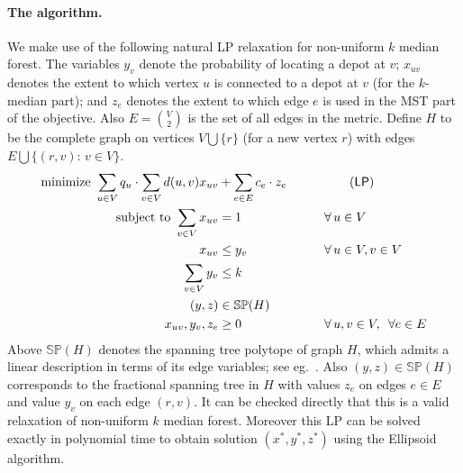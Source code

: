 \documentclass[11pt,twoside,a4paper]{article}
\def\kmf{$k$ median forest\xspace}
\begin{document}
\def\spp{\mathbb{SP}}
\newcommand{\pri}{{\mathcal{P}}}
\newcommand{\lpo}{\ensuremath{\mathsf{LP_{med}}\xspace}}
\newcommand{\LP}{\ensuremath{\mathsf{LP}\xspace}}
\newcommand{\I}{\ensuremath{{\mathcal{I}}}\xspace}
\newcommand{\J}{\ensuremath{{\mathcal{M}}}\xspace}

\paragraph{The algorithm.} We make use of the following natural LP relaxation for non-uniform \kmf. The variables $y_v$ denote the probability
of locating a depot at $v$; $x_{uv}$ denotes the extent to which vertex $u$ is connected to a depot at $v$ (for the
$k$-median part); and $z_e$ denotes the extent to which edge $e$ is used in the MST part of the objective. Also
$E={V\choose 2}$ is the set of all edges in the metric. Define $H$ to be the complete graph on vertices $V\bigcup\{r\}$
(for a new vertex $r$) with edges $E \bigcup \{(r,v) :\, v\in V\}$.
\begin{alignat}{2}
  \mbox{minimize } \sum_{u \in V} q_u \cdot \sum_{v \in V} d(u,v) x_{uv} & + \sum_{e\in E} c_e\cdot z_e & &
  \tag{$\mathsf{LP}$} \\
  \mbox{subject to } \sum_{v \in V} x_{uv} &= 1 & \qquad & \forall \,
  u \in V   \label{eq:1} \\
  x_{uv} &\leq y_{v} & \qquad & \forall \, u \in
  V, v \in V \label{eq:2} \\
  \sum_{v \in V} y_{v} &\leq k  & \qquad & \label{eq:3}\\
  (y,z) &\in \spp(H)& \qquad & \label{eq:4}\\
  x_{uv}, y_{v}, z_e &\geq 0 & \qquad & \forall \, u, v \in V,\,\,\, \forall e\in E \label{eq:5}
\end{alignat}
Above $\spp(H)$ denotes the spanning tree polytope of graph $H$, which admits a linear description in terms of its edge
variables; see eg.~\cite{Schr-book}. Also $(y,z) \in \spp(H)$ corresponds to the fractional spanning tree in $H$ with
values $z_e$ on edges $e\in E$ and value $y_v$ on each edge $(r,v)$. It can be checked directly that this is a valid
relaxation of non-uniform \kmf. Moreover this LP can be solved exactly in polynomial time to obtain solution
$(x^*,y^*,z^*)$ using the Ellipsoid algorithm.
\end{document}
